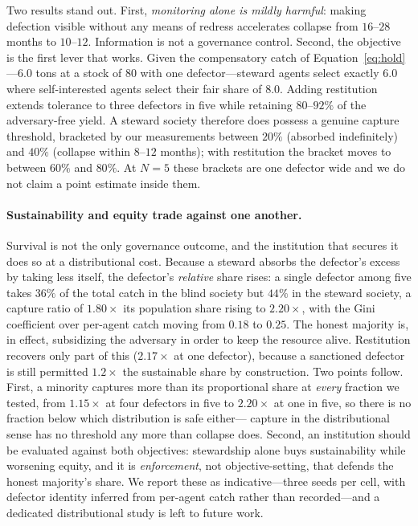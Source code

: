 \documentclass[manuscript,screen,review]{acmart}
\begin{document}
{Two results stand out. First, \emph{monitoring alone is mildly harmful}: making
defection visible without any means of redress accelerates collapse from
$16$--$28$ months to $10$--$12$. Information is not a governance control. Second,
the objective is the first lever that works. Given the compensatory catch of
Equation~\ref{eq:hold}---$6.0$ tons at a stock of $80$ with one defector---steward
agents select exactly $6.0$ where self-interested agents select their fair share
of $8.0$. Adding restitution extends tolerance to three defectors in five while
retaining $80$--$92\%$ of the adversary-free yield. A steward society therefore
does possess a genuine capture threshold, bracketed by our measurements between
$20\%$ (absorbed indefinitely) and $40\%$ (collapse within $8$--$12$ months);
with restitution the bracket moves to between $60\%$ and $80\%$. At $N{=}5$ these
brackets are one defector wide and we do not claim a point estimate inside them.

\paragraph{Sustainability and equity trade against one another.}
Survival is not the only governance outcome, and the institution that secures it
does so at a distributional cost. Because a steward absorbs the defector's excess
by taking less itself, the defector's \emph{relative} share rises: a single
defector among five takes $36\%$ of the total catch in the blind society but
$44\%$ in the steward society, a capture ratio of $1.80\times$ its population
share rising to $2.20\times$, with the Gini coefficient over per-agent catch
moving from $0.18$ to $0.25$. The honest majority is, in effect, subsidizing the
adversary in order to keep the resource alive. Restitution recovers only part of
this ($2.17\times$ at one defector), because a sanctioned defector is still
permitted $1.2\times$ the sustainable share by construction. Two points follow.
First, a minority captures more than its proportional share at \emph{every}
fraction we tested, from $1.15\times$ at four defectors in five to $2.20\times$ at
one in five, so there is no fraction below which distribution is safe either---%
capture in the distributional sense has no threshold any more than collapse does.
Second, an institution should be evaluated against both objectives: stewardship
alone buys sustainability while worsening equity, and it is \emph{enforcement},
not objective-setting, that defends the honest majority's share. We report these
as indicative---three seeds per cell, with defector identity inferred from
per-agent catch rather than recorded---and a dedicated distributional study is
left to future work.

}
\end{document}
